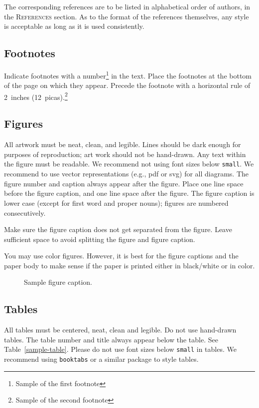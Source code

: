 \documentclass{article} %
\begin{document}
The corresponding references are to be listed in alphabetical order of
authors, in the \textsc{References} section. As to the format of the
references themselves, any style is acceptable as long as it is used
consistently.

\subsection{Footnotes}

Indicate footnotes with a number\footnote{Sample of the first footnote} in the
text. Place the footnotes at the bottom of the page on which they appear.
Precede the footnote with a horizontal rule of 2~inches
(12~picas).\footnote{Sample of the second footnote}

\subsection{Figures}

All artwork must be neat, clean, and legible. Lines should be dark
enough for purposes of reproduction; art work should not be
hand-drawn. Any text within the figure must be readable. We recommend not using font sizes below {\tt small}. We recommend to use vector representations (e.g., pdf or svg) for all diagrams. The figure number and caption always appear after the figure. Place one line space before the figure caption, and one line space after the figure. The figure caption is lower case (except for first word and proper nouns); figures are numbered consecutively.

Make sure the figure caption does not get separated from the figure.
Leave sufficient space to avoid splitting the figure and figure caption.

You may use color figures.
However, it is best for the
figure captions and the paper body to make sense if the paper is printed
either in black/white or in color.
\begin{figure}[h]
\begin{center}
\fbox{\rule[-.5cm]{0cm}{4cm} \rule[-.5cm]{4cm}{0cm}}
\end{center}
\caption{Sample figure caption.}
\end{figure}

\subsection{Tables}

All tables must be centered, neat, clean and legible. Do not use hand-drawn tables. The table number and title always appear below the table. See Table~\ref{sample-table}. Please do not use font sizes below {\tt small} in tables. We recommend using {\tt booktabs} or a similar package to style tables. 
\end{document}

